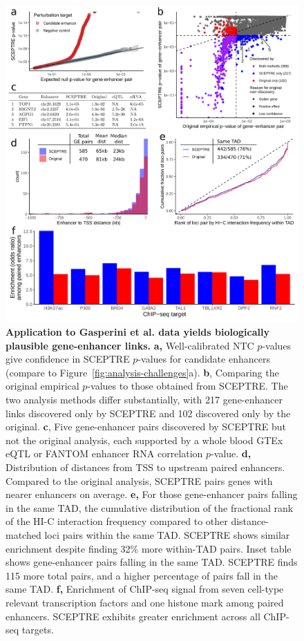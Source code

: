 \documentclass{nature}
\begin{document}
\begin{figure}
	\includegraphics[width = \textwidth]{figures/Figure4/Figure4.png}
	\caption{\textbf{Application to Gasperini et al. data yields biologically plausible gene-enhancer links.}  \textbf{a,} Well-calibrated NTC $p$-values give confidence in SCEPTRE $p$-values for candidate enhancers (compare to Figure~\ref{fig:analysis-challenges}a). \textbf{b}, Comparing the original empirical $p$-values to those obtained from SCEPTRE. The two analysis methods differ substantially, with 217 gene-enhancer links discovered only by SCEPTRE and 102 discovered only by the original. \textbf{c}, Five gene-enhancer pairs discovered by SCEPTRE but not the original analysis, each supported by a whole blood GTEx eQTL or FANTOM enhancer RNA correlation $p$-value. \textbf{d,} Distribution of distances from TSS to upstream paired enhancers. Compared to the original analysis, SCEPTRE pairs genes with nearer enhancers on average. \textbf{e,} For those gene-enhancer pairs falling in the same TAD, the cumulative distribution of the fractional rank of the HI-C interaction frequency compared to other distance-matched loci pairs within the same TAD. SCEPTRE shows similar enrichment despite finding 32\% more within-TAD pairs. Inset table shows gene-enhancer pairs falling in the same TAD. SCEPTRE finds 115 more total pairs, and a higher percentage of pairs fall in the same TAD. \textbf{f,} Enrichment of ChIP-seq signal from seven cell-type relevant transcription factors and one histone mark among paired enhancers. SCEPTRE exhibits greater enrichment across all ChIP-seq targets.}
	\label{fig:application}
\end{figure}
\end{document}

